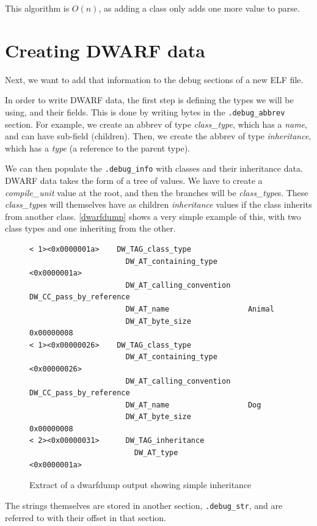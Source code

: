 \documentclass[a4paper,11pt,oneside]{report}
\begin{document}
This algorithm is $O(n)$, as adding a class only adds one more value to parse.


\section{Creating DWARF data}
\label{dwarfimplementation}

Next, we want to add that information to the debug sections of a new ELF file.

In order to write DWARF data, the first step is defining the types we will be 
using, and their fields.
This is done by writing bytes in the \texttt{.debug\_abbrev} section.
For example, we create an abbrev of type \emph{class\_type}, which has a 
\emph{name}, and can have sub-field (children).
Then, we create the abbrev of type \emph{inheritance}, which has a 
\emph{type} (a reference to the parent type).

We can then populate the \texttt{.debug\_info} with classes and their 
inheritance data.
DWARF data takes the form of a tree of values. We have to create a 
\emph{compile\_unit} value at the root, and then the branches will be 
\emph{class\_type}s.
These \emph{class\_type}s will themselves have as children 
\emph{inheritance} values if the class inherits from another class.
\autoref{dwarfdump} shows a very simple example of this, with two class types 
and one inheriting from the other.

\begin{figure}
\begin{lstlisting}
< 1><0x0000001a>    DW_TAG_class_type
                      DW_AT_containing_type       <0x0000001a>
                      DW_AT_calling_convention    DW_CC_pass_by_reference
                      DW_AT_name                  Animal
                      DW_AT_byte_size             0x00000008
< 1><0x00000026>    DW_TAG_class_type
                      DW_AT_containing_type       <0x00000026>
                      DW_AT_calling_convention    DW_CC_pass_by_reference
                      DW_AT_name                  Dog
                      DW_AT_byte_size             0x00000008
< 2><0x00000031>      DW_TAG_inheritance
                        DW_AT_type                  <0x0000001a>
\end{lstlisting}
\caption{Extract of a dwarfdump output showing simple inheritance}
\label{dwarfdump}
\end{figure}

The strings themselves are stored in another section, \texttt{.debug\_str}, and 
are referred to with their offset in that section.
\end{document}
